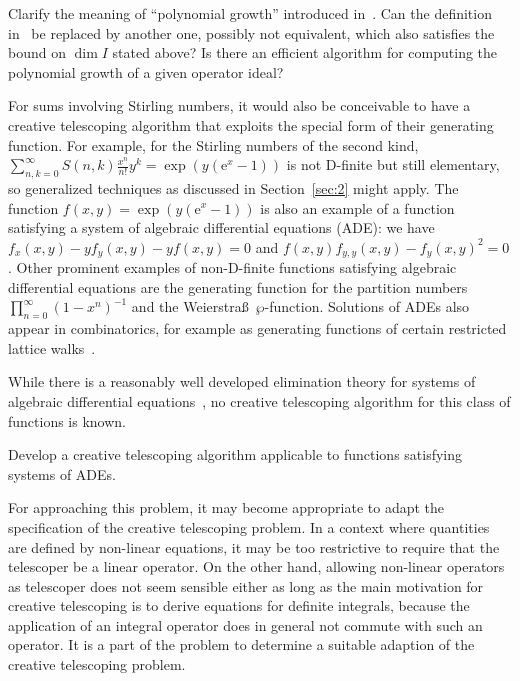 \documentclass{jssc}
\def\e{\mathrm{e}}
\begin{document}
 \begin{problem}
   Clarify the meaning of ``polynomial growth'' introduced in~\cite{chyzak09a}.
   Can the definition in~\cite{chyzak09a} be replaced by another one, possibly not equivalent, which also
   satisfies the bound on $\dim I$ stated above?
   Is there an efficient algorithm for computing the polynomial growth of a given operator ideal?
 \end{problem}

 For sums involving Stirling numbers, it would also be conceivable to have a
 creative telescoping algorithm that exploits the special form of their
 generating function. For example, for the Stirling numbers of the second kind,
 $\sum_{n,k=0}^\infty S(n,k)\frac{x^n}{n!} y^k=\exp(y(\e^x-1))$ is not D-finite
 but still elementary, so generalized techniques as discussed in
 Section~\ref{sec:2} might apply. The function $f(x,y)=\exp(y(\e^x-1))$ is also
 an example of a function satisfying a system of algebraic differential equations (ADE):
 we have $f_x(x,y)-y f_y(x,y)-yf(x,y)=0$ and $f(x,y)f_{y,y}(x,y) - f_y(x,y)^2 = 0$.
 Other prominent examples of non-D-finite functions satisfying algebraic differential
 equations are the generating function for the partition numbers $\prod_{n=0}^\infty(1-x^n)^{-1}$
 and the Weierstra\ss\ $\wp$-function. Solutions of ADEs also appear in combinatorics, for
 example as generating functions of certain restricted lattice walks~\cite{bernardi16}.

 While there is a reasonably well developed elimination theory for systems of algebraic
 differential equations~\cite{mansfield93,gerdt97,hubert00,chen03, gao2013}, no creative telescoping algorithm for this class
 of functions is known.

 \begin{problem}
   Develop a creative telescoping algorithm applicable to functions satisfying
   systems of ADEs.
 \end{problem}

 For approaching this problem, it may become appropriate to adapt the
 specification of the creative telescoping problem. In a context where
 quantities are defined by non-linear equations, it may be too restrictive to
 require that the telescoper be a linear operator. On the other hand, allowing
 non-linear operators as telescoper does not seem sensible either as long as the
 main motivation for creative telescoping is to derive equations for definite
 integrals, because the application of an integral operator does in general not
 commute with such an operator. It is a part of the
 problem to determine a suitable adaption of the creative telescoping problem.
\end{document}
